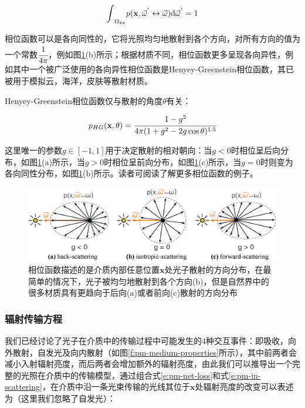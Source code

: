 \begin{equation}
	{\rm \int}_{\Omega_{4\pi}}p(\mathbf{x},\vec{\omega}^{'}\leftrightarrow\vec{\omega}){\rm d}\vec{\omega}^{'}=1
\end{equation}

相位函数可以是各向同性的，它将光照均匀地散射到各个方向，对所有方向的值为一个常数$ \cfrac{1}{4\pi}$，例如图\ref{f:pm-phase-function}(b)所示；根据材质不同，相位函数更多呈现各向异性，例如其中一个被广泛使用的各向异性相位函数是Henyey-Greenstein相位函数\cite{a:Diffuseradiationinthegalaxy,a:EfficientMonteCarloMethodsforLightTransportinScatteringMedia}，其已被用于模拟云，海洋，皮肤等散射材质。

Henyey-Greenstein相位函数仅与散射的角度$\theta$有关：

\begin{equation}
	p_{HG}(\mathbf{x},\theta)= \cfrac{1-g^{2}}{4\pi(1+g^{2}-2g\cos{\theta})^{1.5}}
\end{equation}

\noindent 这里唯一的参数$g\in[-1,1]$用于决定散射的相对朝向：当$g<0$时相位呈后向分布，如图\ref{f:pm-phase-function}(a)所示，当$g>0$时相位呈前向分布，如图\ref{f:pm-phase-function}(c)所示，当$g=0$时则变为各向同性分布，如图\ref{f:pm-phase-function}(b)所示。读者可阅读\cite{a:EfficientMonteCarloMethodsforLightTransportinScatteringMedia}了解更多相位函数的例子。

\begin{figure}
\begin{fullwidth}
	\includegraphics[width=\thewidth]{figures/pm/phase-function}
	\caption{相位函数描述的是介质内部任意位置$\mathbf{x}$处光子散射的方向分布，在最简单的情况下，光子被均匀地散射到各个方向(b)，但是自然界中的很多材质具有更趋向于后向(a)或者前向(c)散射的方向分布}
	\label{f:pm-phase-function}
\end{fullwidth}
\end{figure}






\subsubsection{辐射传输方程}
我们已经讨论了光子在介质中的传输过程中可能发生的4种交互事件：即吸收，向外散射，自发光及向内散射（如图\ref{f:pm-medium-properties}所示），其中前两者会减小入射辐射亮度，而后两者会增加额外的辐射亮度，由此我们可以推导出一个完整的光照在介质中的传输模型，通过组合式\ref{e:pm-net-loss}和式\ref{e:pm-in-scattering}，在介质中沿一条光束传输的光线其位于$\mathbf{x}$处辐射亮度的改变可以表述为（这里我们忽略了自发光）：

